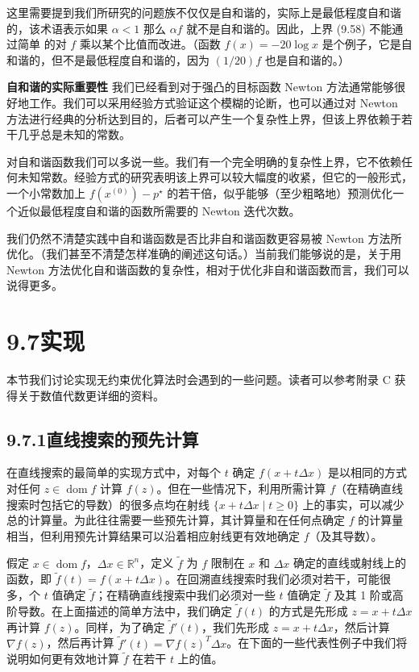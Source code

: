 \documentclass[UTF8, 12pt, fontset=fandol, oneside]{ctexart}
\begin{document}
这里需要提到我们所研究的问题族不仅仅是自和谐的，实际上是最低程度自和谐的，该术语表示如果 $\alpha<1$ 那么 $\alpha f$ 就不是自和谐的。因此，上界 (9.58) 不能通过简单
的对 $f$ 乘以某个比值而改进。（函数 $f(x)=-20\log x$ 是个例子，它是自和谐的，但不是最低程度自和谐的，因为 $(1/20)f$ 也是自和谐的。）

\noindent\textbf{自和谐的实际重要性}\quad
我们已经看到对于强凸的目标函数 Newton 方法通常能够很好地工作。我们可以采用经验方式验证这个模糊的论断，也可以通过对 Newton 方法进行经典的分析达到目的，后者可以产生一个复杂性上界，但该上界依赖于若干几乎总是未知的常数。

对自和谐函数我们可以多说一些。我们有一个完全明确的复杂性上界，它不依赖任何未知常数。经验方式的研究表明该上界可以较大幅度的收紧，但它的一般形式，一个小常数加上 $f(x^{(0)})-p^\star$ 的若干倍，似乎能够（至少粗略地）预测优化一个近似最低程度自和谐的函数所需要的 Newton 迭代次数。

我们仍然不清楚实践中自和谐函数是否比非自和谐函数更容易被 Newton 方法所优化。（我们甚至不清楚怎样准确的阐述这句话。）当前我们能够说的是，关于用 Newton 方法优化自和谐函数的复杂性，相对于优化非自和谐函数而言，我们可以说得更多。

\section*{9.7\quad 实现}

本节我们讨论实现无约束优化算法时会遇到的一些问题。读者可以参考附录 C 获得关于数值代数更详细的资料。

\subsection*{9.7.1\quad 直线搜索的预先计算}

在直线搜索的最简单的实现方式中，对每个 $t$ 确定 $f(x+t\Delta x)$ 是以相同的方式对任何 $z\in\operatorname{dom} f$ 计算 $f(z)$。但在一些情况下，利用所需计算 $f$（在精确直线搜索时包括它的导数）的很多点均在射线 $\{x+t\Delta x\mid t\geq0\}$ 上的事实，可以减少总的计算量。为此往往需要一些预先计算，其计算量和在任何点确定 $f$ 的计算量相当，但利用预先计算结果可以沿着相应射线更有效地确定 $f$（及其导数）。

假定 $x\in\operatorname{dom} f$，$\Delta x\in\mathbb{R}^n$，定义 $\tilde{f}$ 为 $f$ 限制在 $x$ 和 $\Delta x$ 确定的直线或射线上的函数，即 $\tilde{f}(t)=f(x+t\Delta x)$。在回溯直线搜索时我们必须对若干，可能很多，个 $t$ 值确定 $\tilde{f}$；在精确直线搜索中我们必须对一些 $t$ 值确定 $\tilde{f}$ 及其 1 阶或高阶导数。在上面描述的简单方法中，我们确定 $\tilde{f}(t)$ 的方式是先形成 $z=x+t\Delta x$ 再计算 $f(z)$。同样，为了确定 $\tilde{f}'(t)$，我们先形成 $z=x+t\Delta x$，然后计算 $\nabla f(z)$，然后再计算 $\tilde{f}'(t)=\nabla f(z)^T\Delta x$。在下面的一些代表性例子中我们将说明如何更有效地计算 $\tilde{f}$ 在若干 $t$ 上的值。
\end{document}
